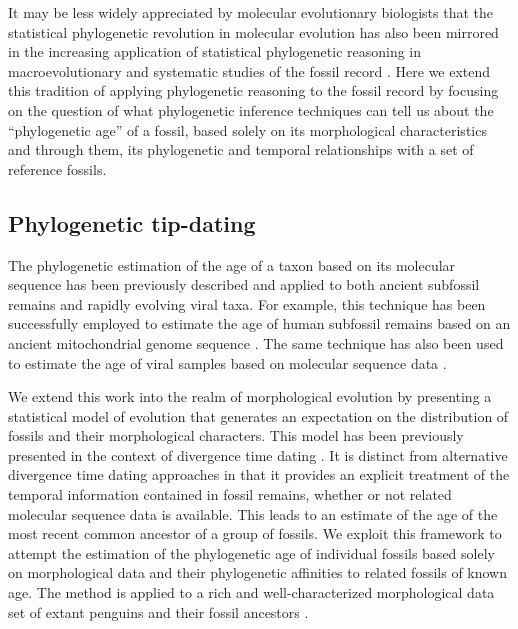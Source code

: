 \documentclass[11pt]{article}
\begin{document}
It may be less widely appreciated by molecular evolutionary biologists that the statistical phylogenetic revolution in molecular evolution has also been mirrored in the increasing application of statistical phylogenetic reasoning in macroevolutionary and systematic studies of the fossil record \autocite[e.g.][]{Foote1996,huelsenbeck1997maximum, tavare2002using, WagnerMarcot2013}. 
Here we extend this tradition of applying phylogenetic reasoning to the fossil record by focusing on the question of what phylogenetic inference techniques can tell us about the ``phylogenetic age'' of a fossil, based solely on its morphological characteristics and through them, its phylogenetic and temporal relationships with a set of reference fossils.

\subsection*{Phylogenetic tip-dating}

The phylogenetic estimation of the age of a taxon based on its molecular sequence has been previously described \autocite{drummond2002computational,shapiro2011bayesian} and applied to both ancient subfossil remains and rapidly evolving viral taxa. For example, this technique has been successfully employed to estimate the age of human subfossil remains based on an ancient mitochondrial genome sequence \autocite{meyer2014mitochondrial}. The same technique has also been used to estimate the age of viral samples based on molecular sequence data \autocite[e.g.][]{gray2013evolutionary}.

We extend this work into the realm of morphological evolution by presenting a statistical model of evolution that generates an expectation on the distribution of fossils and their morphological characters. 
This model has been previously presented in the context of divergence time dating \autocite{gavr2014,gavryushkina2015bayesian}. 
It is distinct from alternative divergence time dating approaches in that it provides an explicit treatment of the temporal information contained in fossil remains, whether or not related molecular sequence data is available. 
This leads to an estimate of the age of the most recent common ancestor of a group of fossils. 
We exploit this framework to attempt the estimation of the phylogenetic age of individual fossils based solely on morphological data and their phylogenetic affinities to related fossils of known age. 
The method is applied to a rich and well-characterized morphological data set of extant penguins and their fossil ancestors \autocite{ksepka2010,ksepka2012}.
\end{document}

